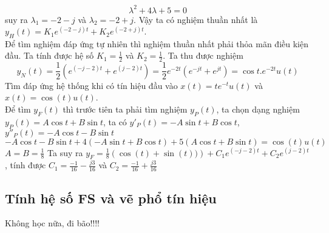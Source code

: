 \documentclass{article}
\begin{document}
$$\lambda^2+4\lambda+5=0$$ suy ra $\lambda_{1}=-2-j$ và $\lambda_{2}=-2+j$. Vậy ta có nghiệm thuần nhất là $y_{H}(t)=K_{1}e^{(-2-j)t}+K_{2}e^{(-2+j)t}$.
\\Để tìm nghiệm đáp ứng tự nhiên thì nghiệm thuần nhất phải thỏa mãn điều kiện đầu. Ta tính được hệ số $K_{1}=\frac{1}{2}$ và $K_{2}=\frac{1}{2}$. Ta thu được nghiệm 
$$y_{N}(t)=\frac{1}{2}(e^{(-j-2)t}+e^{(j-2)t})=\frac{1}{2}e^{-2t}(e^{-jt}+e^{jt})=\cos{t}.e^{-2t}u(t)$$
Tìm đáp ứng hệ thống khi có tín hiệu đầu vào $x(t)=te^{-t}u(t)$ và $x(t)=\cos{(t)}u(t)$.
\\Để tìm $y_{F}(t)$ thì trước tiên ta phải tìm nghiệm $y_{P}(t)$, ta chọn dạng nghiệm $y_{P}(t)=A\cos{t}+B\sin{t}$, ta có $y'_{P}(t)=-A\sin{t}+B\cos{t}$, $y''_{P}(t)=-A\cos{t}-B\sin{t}$
$$-A\cos{t}-B\sin{t}+4(-A\sin{t}+B\cos{t})+5(A\cos{t}+B\sin{t})=\cos{(t)}u{(t)}$$
$A=B=\frac{1}{8}$
Ta suy ra $y_{F}=\frac{1}{8}\left(\cos{(t)}+\sin{(t)})\right)+C_{1}e^{(-j-2)t}+C_{2}e^{(j-2)t}$, tính được $C_{1}=\frac{-1}{16}-\frac{j3}{16}$ và $C_{2}=\frac{-1}{16}+\frac{j3}{16}$

\subsection{Tính hệ số FS và vẽ phổ tín hiệu}
Không học nữa, đi bão!!!!
\end{document}
